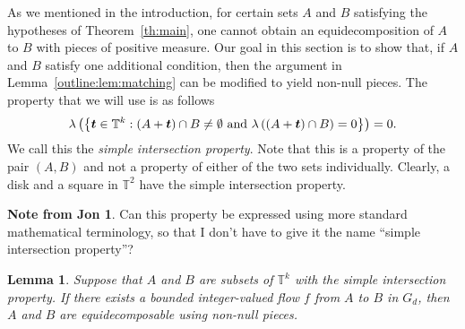 \documentclass[12pt,a4paper]{amsart}
\numberwithin{equation}{section}
\newtheorem{lemma}[equation]{Lemma}
\theoremstyle{definition}
\newtheorem*{JN}{Note from Jon}
\begin{document}
As we mentioned in the introduction, for certain sets $A$ and $B$ satisfying the hypotheses of Theorem~\ref{th:main}, one cannot obtain an equidecomposition of $A$ to $B$ with pieces of positive measure. Our goal in this section is to show that, if $A$ and $B$ satisfy one additional condition, then the argument in Lemma~\ref{outline:lem:matching} can be modified to yield non-null pieces.  The property that we will use is as follows
\[\lambda\left(\left\{\boldsymbol{t}\in\mathbb{T}^k: (A+\boldsymbol{t})\cap B\neq \emptyset \text{ and } \lambda\left((A+\boldsymbol{t})\cap B\right)=0\right\}\right) = 0.\]
We call this the \emph{simple intersection property}. Note that this is a property of the pair $(A,B)$ and not a property of either of the two sets individually. Clearly, a disk and a square in $\mathbb{T}^2$ have the simple intersection property. 

\begin{JN}
Can this property be expressed using more standard mathematical terminology, so that I don't have to give it the name ``simple intersection property''?
\end{JN}

\begin{lemma}
\label{lem:nonNull}
Suppose that $A$ and $B$ are subsets of $\mathbb{T}^k$ with the simple intersection property. If there exists a bounded integer-valued flow $f$ from $A$ to $B$ in $G_d$, then $A$ and $B$ are equidecomposable using non-null pieces. 
\end{lemma}
\end{document}
